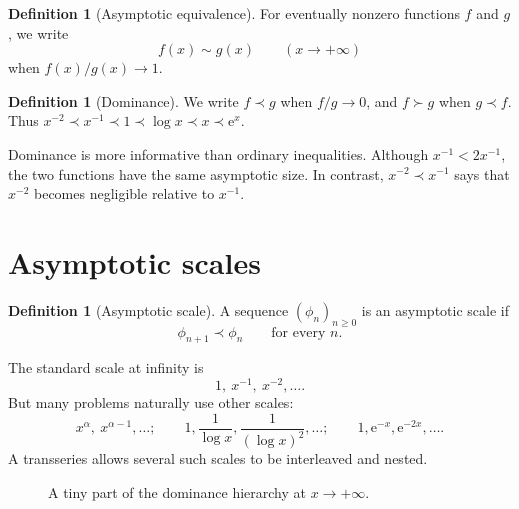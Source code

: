 \documentclass[11pt,oneside]{book}
\theoremstyle{definition}
\newtheorem{definition}[theorem]{Definition}
\theoremstyle{remark}
\newcommand{\e}{\mathrm{e}}
\newcommand{\precdom}{\prec}
\newcommand{\succdom}{\succ}
\begin{document}
\begin{definition}[Asymptotic equivalence]
For eventually nonzero functions $f$ and $g$, we write
\[
  f(x)\sim g(x) \qquad (x\to+\infty)
\]
when $f(x)/g(x)\to1$.
\end{definition}

\begin{definition}[Dominance]
We write $f\precdom g$ when $f/g\to0$, and $f\succdom g$ when $g\precdom f$.
Thus $x^{-2}\precdom x^{-1}\precdom1\precdom\log x\precdom x\precdom\e^x$.
\end{definition}

Dominance is more informative than ordinary inequalities. Although
$x^{-1}<2x^{-1}$, the two functions have the same asymptotic size. In contrast,
$x^{-2}\precdom x^{-1}$ says that $x^{-2}$ becomes negligible relative to
$x^{-1}$.

\section{Asymptotic scales}

\begin{definition}[Asymptotic scale]
A sequence $(\phi_n)_{n\ge0}$ is an asymptotic scale if
\[
  \phi_{n+1}\precdom\phi_n
  \qquad\text{for every }n.
\]
\end{definition}

The standard scale at infinity is
\[
  1,\ x^{-1},\ x^{-2},\ldots.
\]
But many problems naturally use other scales:
\[
  x^\alpha,\ x^{\alpha-1},\ldots;
  \qquad
  1,\frac1{\log x},\frac1{(\log x)^2},\ldots;
  \qquad
  1,\e^{-x},\e^{-2x},\ldots.
\]
A transseries allows several such scales to be interleaved and nested.

\begin{figure}[ht]
\centering
{}
\caption{A tiny part of the dominance hierarchy at $x\to+\infty$.}
\label{fig:growth-ladder}
\end{figure}
\end{document}
